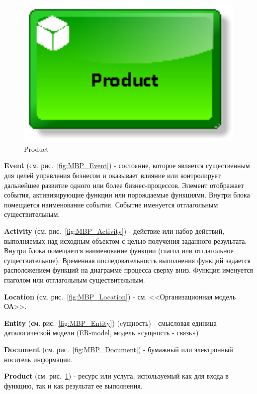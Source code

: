 \begin{figure}[!h]
\begin{minipage}{0.15\textwidth}
        \includegraphics[width=0.99\textwidth]
            {_docs/МБП_Product.png}
        \caption{Product}
        \label{fig:MBP_Product}
    \end{minipage}
\end{figure}

\textbf{Event} (см. рис.~\ref{fig:MBP_Event}) - состояние, которое является существенным для целей управления бизнесом
и оказывает влияние или контролирует дальнейшее развитие одного или более бизнес-процессов.
Элемент отображает события, активизирующие функции или порождаемые функциями.
Внутри блока помещается наименование события.
Событие именуется отглагольным существительным.

\textbf{Activity} (см. рис.~\ref{fig:MBP_Activity}) - действие или набор действий, выполняемых над исходным объектом с целью получения заданного результата.
Внутри блока помещается наименование функции (глагол или отглагольное существительное).
Временная последовательность выполнения функций задается расположением функций на диаграмме процесса сверху вниз.
Функция именуется глаголом или отглагольным существительным.

\textbf{Location} (см. рис.~\ref{fig:MBP_Location}) - см. <<Организационная модель ОА>>.

\textbf{Entity} (см. рис.~\ref{fig:MBP_Entity}) (cущность) - смысловая единица даталогической модели (ER-model, модель «сущность - связь»)

\textbf{Document} (см. рис.~\ref{fig:MBP_Document}) - бумажный или электронный носитель информации.

\textbf{Product} (см. рис.~\ref{fig:MBP_Product}) - ресурс или услуга, используемый как для входа в функцию, так и как результат ее выполнения.

